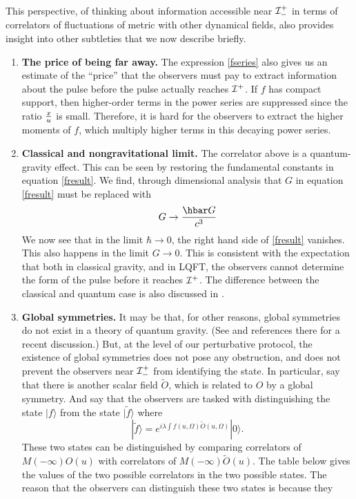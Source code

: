 \documentclass[12pt]{article}
\def\gnewt{G}
\newcommand{\be}{\begin{equation}}
\newcommand{\ee}{\end{equation}}
\def \scrip{{\cal I}^{+}}
\def \scrippast{{\cal I}^{+}_{-}}
\begin{document}
This perspective, of thinking about information accessible near $\scrippast$ in terms of correlators of fluctuations
of metric with other dynamical fields, also provides insight into other subtleties that we now describe briefly.
\begin{enumerate}
\item
{\bf The price of being far away.}
The expression \eqref{fseries} also gives us an estimate of the ``price'' that the observers must pay to extract information about the pulse before the pulse actually reaches $\scrip$. If $f$ has compact support, then  higher-order terms in the power series are suppressed since the ratio ${x \over u}$ is small. Therefore, it is hard for the observers to extract the higher moments of $f$, which multiply higher terms in this decaying power series.
\item
{\bf Classical and nongravitational limit.} The correlator above is a quantum-gravity effect. This can be seen by restoring the fundamental constants in equation \eqref{fresult}. We find, through dimensional analysis that $\gnewt$ in equation \eqref{fresult} must be replaced with
\be
\gnewt \rightarrow {\hbar \gnewt \over c^3}
\ee
We now see that in the limit $\hbar \rightarrow 0$, the right hand side of \eqref{fresult} vanishes. This also happens in the limit $\gnewt \rightarrow 0$. This is consistent with the expectation that both in classical gravity, and in LQFT,  the observers cannot determine the form of the pulse before it reaches $\scrip$. The difference between the classical and quantum case is also discussed in \cite{Jacobson:2019gnm}.
\item
{\bf Global symmetries.} It may be that, for other reasons, global symmetries do not exist in a theory of quantum gravity. (See \cite{Harlow:2018tng} and references there for a recent discussion.) But, at the level of our perturbative protocol, the existence of global symmetries does not pose any obstruction, and does not prevent the observers near $\scrippast$ from identifying the state. In particular, say that there is another scalar field $\widetilde{O}$, which is related to $O$ by a global symmetry. And say that the observers are tasked with distinguishing the state $|f \rangle$ from the state $|\widetilde{f} \rangle$ where
\be
\label{ftildedef}
|\widetilde{f} \rangle = e^{i \lambda \int f(u, \Omega) \widetilde{O}(u, \Omega)} |0 \rangle.
\ee
These two states can be distinguished by comparing correlators of $M(-\infty) O(u)$ with correlators of $M(-\infty) \widetilde{O}(u)$. The table below gives the values of the two possible correlators in the two possible states. The reason that the observers can distinguish these two states is because they

\end{enumerate}
\end{document}
